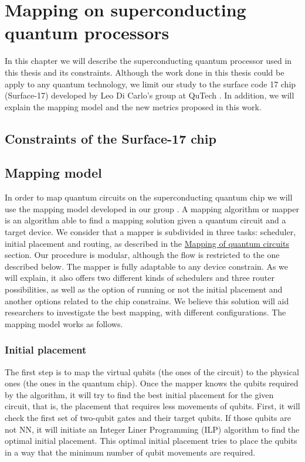 

\chapter{Mapping on superconducting quantum processors}
\label{sec:org0c87802}

In this chapter we will describe the superconducting quantum processor used in this thesis and its constraints. 
Although the work done in this thesis  could be apply to any quantum technology, we limit our study to the surface code 17 chip (Surface-17) developed by Leo Di Carlo's group at QuTech \cite{Versluis_2017}.
In addition, we will explain the mapping model and the new metrics proposed in this work.

\section{Constraints of the Surface-17 chip}
\label{sec:org168a66d}


\section{Mapping model}
\label{sec:org19dc500}
In order to map quantum circuits on the superconducting quantum chip we will use the mapping model developed in our group \cite{Lao_2018}.
A mapping algorithm or mapper is an algorithm able to find a mapping solution given a quantum circuit and a target device.
We consider that a mapper is subdivided in three tasks: scheduler, initial placement and routing, as described in the \hyperref[sec:orgd680d43]{Mapping of quantum circuits} section.
Our procedure is modular, although the flow is restricted to the one described below.
The mapper is fully adaptable to any device constrain.
As we will explain, it also offers two different kinds of schedulers and three router possibilities, as well as the option of running or not the initial placement and another options related to the chip constrains.
We believe this solution will aid researchers to investigate the best mapping, with different configurations.
The mapping model works as follows.

\subsection{Initial placement}
\label{sec:org4fe48f6}

The first step is to map the virtual qubits (the ones of the circuit) to the physical ones (the ones in the quantum chip).
Once the mapper knows the qubits required by the algorithm, it will try to find the best initial placement for the given circuit, that is, the placement that requires less movements of qubits.
First, it will check the first set of two-qubit gates and their target qubits.
If those qubits are not NN, it will initiate an Integer Liner Programming (ILP) algorithm \cite{Lao_2018} to find the optimal initial placement.
This optimal initial placement tries to place the qubits in a way that the minimum number of qubit movements are required.


